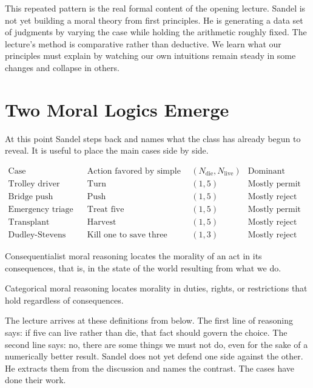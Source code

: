 This repeated pattern is the real formal content of the opening lecture. Sandel is not yet building a moral theory from first principles. He is generating a data set of judgments by varying the case while holding the arithmetic roughly fixed. The lecture's method is comparative rather than deductive. We learn what our principles must explain by watching our own intuitions remain steady in some changes and collapse in others.

\section{Two Moral Logics Emerge}

At this point Sandel steps back and names what the class has already begun to reveal. It is useful to place the main cases side by side.

\begin{table}[h]
\centering
\[
\begin{array}{l|l|l|l}
\text{Case} & \text{Action favored by simple counting} & (N_{\text{die}},N_{\text{live}}) & \text{Dominant reaction} \\ \hline
\text{Trolley driver} & \text{Turn} & (1,5) & \text{Mostly permit} \\
\text{Bridge push} & \text{Push} & (1,5) & \text{Mostly reject} \\
\text{Emergency triage} & \text{Treat five} & (1,5) & \text{Mostly permit} \\
\text{Transplant surgeon} & \text{Harvest} & (1,5) & \text{Mostly reject} \\
\text{Dudley-Stevens defense} & \text{Kill one to save three} & (1,3) & \text{Mostly reject}
\end{array}
\]
\end{table}

\begin{definition}
Consequentialist moral reasoning locates the morality of an act in its consequences, that is, in the state of the world resulting from what we do.
\end{definition}

\begin{definition}
Categorical moral reasoning locates morality in duties, rights, or restrictions that hold regardless of consequences.
\end{definition}

The lecture arrives at these definitions from below. The first line of reasoning says: if five can live rather than die, that fact should govern the choice. The second line says: no, there are some things we must not do, even for the sake of a numerically better result. Sandel does not yet defend one side against the other. He extracts them from the discussion and names the contrast. The cases have done their work.


